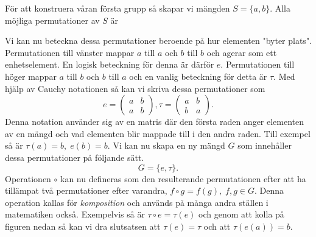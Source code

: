 \documentclass{article}
\theoremstyle{definition}
\begin{document}
För att konstruera våran första grupp så skapar vi mängden $S = \{a, b\}.$
Alla möjliga permutationer av $S$ är 
\begin{center}
\end{center}
Vi kan nu beteckna dessa permutationer beroende på hur elementen "byter plats". Permutationen
till vänster mappar $a$ till $a$ och $b$ till $b$ och agerar som ett enhetselement. En 
logisk beteckning för denna är därför $e$. Permutationen till höger mappar $a$ till $b$ och 
$b$ till $a$ och en vanlig beteckning för detta är $\tau.$ 
Med hjälp av Cauchy notationen så kan vi skriva dessa permutationer som 
\[e = 
\begin{pmatrix}
  a & b \\
  a & b
\end{pmatrix},
\tau = 
\begin{pmatrix}
  a & b \\
  b & a
\end{pmatrix}.
\]
Denna notation använder sig av en matris där den första raden anger elementen av en mängd 
och vad elementen blir mappade till i den andra raden.
Till exempel så är $\tau (a) = b, \; e(b) = b.$
Vi kan nu skapa en ny mängd
$G$ som innehåller dessa permutationer på följande sätt.
\[G = \{e, \tau\}.\]
Operationen $\circ$ kan nu defineras som den resulterande permutationen efter att ha 
tillämpat två permutationer efter varandra, $f \circ g = f(g), \; f, g \in G.$ Denna operation kallas för \textit{komposition} och används på många andra ställen i matematiken också.
Exempelvis så är $\tau \circ e = 
\tau (e)$ och genom att kolla på figuren nedan så kan vi dra slutsatsen att 
$\tau (e) = \tau$ och att $\tau (e(a)) = b.$ 
\end{document}
